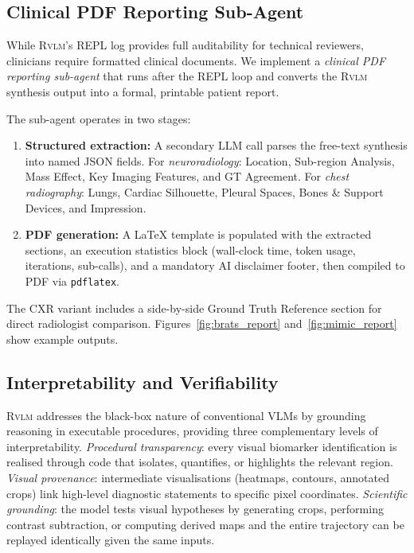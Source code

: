 \documentclass{article}
\newcommand{\RVLM}{\textsc{Rvlm}}
\begin{document}
	\subsection{Clinical PDF Reporting Sub-Agent}
	\label{sec:report}
	
	While \RVLM{}'s REPL log provides full auditability for technical reviewers,
	clinicians require formatted clinical documents.
	We implement a \emph{clinical PDF reporting sub-agent} that runs after the
	REPL loop and converts the \RVLM{} synthesis output into a formal,
	printable patient report.
	
	The sub-agent operates in two stages:
	\begin{enumerate}[leftmargin=*,itemsep=2pt]
		\item \textbf{Structured extraction:} A secondary LLM call parses the
		free-text synthesis into named JSON fields.
		For \emph{neuroradiology}: Location, Sub-region Analysis, Mass
		Effect, Key Imaging Features, and GT Agreement.
		For \emph{chest radiography}: Lungs, Cardiac Silhouette, Pleural
		Spaces, Bones \& Support Devices, and Impression.
		
		\item \textbf{PDF generation:} A \LaTeX{} template is populated with
		the extracted sections, an execution statistics block (wall-clock
		time, token usage, iterations, sub-calls), and a mandatory AI
		disclaimer footer, then compiled to PDF via \texttt{pdflatex}.
	\end{enumerate}
	
	The CXR variant includes a side-by-side Ground Truth Reference section
	for direct radiologist comparison.
	Figures~\ref{fig:brats_report} and~\ref{fig:mimic_report} show example
	outputs.
	
	\subsection{Interpretability and Verifiability}
	\label{sec:interpretability}
	
	\RVLM{} addresses the black-box nature of conventional VLMs by grounding
	reasoning in executable procedures, providing three complementary levels of
	interpretability.
	\emph{Procedural transparency}: every visual biomarker identification is
	realised through code that isolates, quantifies, or highlights the relevant
	region.
	\emph{Visual provenance}: intermediate visualisations (heatmaps, contours,
	annotated crops) link high-level diagnostic statements to specific pixel
	coordinates.
	\emph{Scientific grounding}: the model tests visual hypotheses by generating
	crops, performing contrast subtraction, or computing derived maps and the
	entire trajectory can be replayed identically given the same inputs.
	
\end{document}
